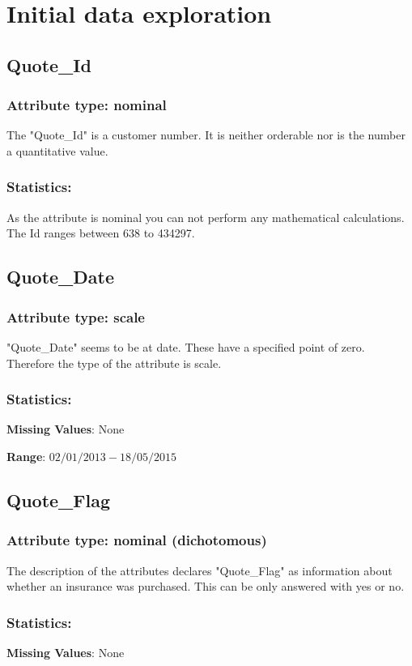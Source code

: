 
\section{Initial data exploration}
\subsection{Quote\_Id}
\subsubsection{Attribute type: nominal}
The "Quote\_Id" is a customer number. It is neither orderable nor is the number a quantitative value.
\subsubsection{Statistics: } As the attribute is nominal you can not perform any mathematical calculations. The Id ranges between 638 to 434297.

\subsection{Quote\_Date}
\subsubsection{Attribute type: scale}
"Quote\_Date" seems to be at date. These have a specified point of zero. Therefore the type of the attribute is scale.
\subsubsection{Statistics: } 
\textbf{Missing Values}: None

\textbf{Range}: $02/01/2013 - 18/05/2015$


\subsection{Quote\_Flag}
\subsubsection{Attribute type: nominal (dichotomous)}
The description of the attributes declares "Quote\_Flag" as information about whether an insurance was purchased. This can be only answered with yes or no.
\subsubsection{Statistics: }
\textbf{Missing Values}: None


